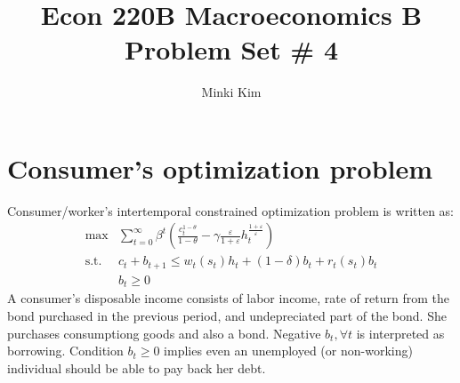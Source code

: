 \documentclass[12pt]{amsart}
\title{Econ 220B Macroeconomics B Problem Set \# 4}
\author{Minki Kim}
\begin{document}
	
	
\maketitle
\section{Consumer's optimization problem}
Consumer/worker's intertemporal constrained optimization problem is written as: 
\begin{align*}
\max &\sum_{t = 0}^{\infty} \beta^t \left( \frac{c_t^{1-\theta}}{1-\theta}  - \gamma \frac{\varepsilon}{1+\varepsilon} h_t^{\frac{1+\varepsilon}{\varepsilon}} \right) \\
\text{s.t. } & c_t + b_{t+1} \leq w_t(s_t) h_t + (1-\delta) b_{t} + r_t(s_t) b_{t} \\
& b_t \geq 0
\end{align*}
A consumer's disposable income consists of labor income, rate of return from the bond purchased in the previous period, and undepreciated part of the bond. She purchases consumptiong goods and also a bond. Negative $b_{t}, \forall t$ is interpreted as borrowing. Condition $b_t \geq 0$ implies even an unemployed (or non-working) individual should be able to pay back her debt. 
\end{document}
